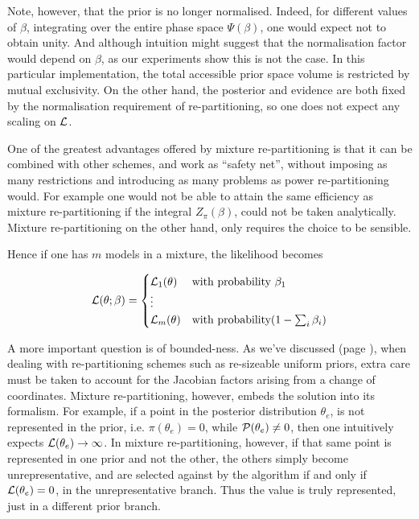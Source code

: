 \documentclass[usenatbib]{mnras}
\begin{document}
Note, however, that the prior is no longer normalised. Indeed, for
different values of \(\beta\), integrating over the entire phase
space \(\Psi(\beta)\), one would expect not to obtain unity. And
although intuition might suggest that the normalisation factor
would depend on \(\beta\), as our experiments show this is not the
case. In this particular implementation, the total accessible
prior space volume is restricted by mutual exclusivity. On the
other hand, the posterior and evidence are both fixed by the
normalisation requirement of re-partitioning, so one does not
expect any scaling on \({\cal L}\). 

One of the greatest advantages offered by mixture re-partitioning
is that it can be combined with other schemes, and work as
``safety net'', without imposing as many restrictions and
introducing as many problems as power re-partitioning would. For
example one would not be able to attain the same efficiency as
mixture re-partitioning if the integral \(Z_{\pi}(\beta)\), could not
be taken analytically. Mixture re-partitioning on the other hand,
only requires the choice to be sensible.

Hence if one has \(m\) models in a mixture, the likelihood becomes 

\begin{equation}
  {\cal L}(\theta; \beta)  = \begin{cases}
	{\cal L}_{1}(\theta) & \text{with probability } \beta_{1}\\
    \vdots\\
	{\cal L}_{m}(\theta) & \text{with probability} (1- \sum_{i}\beta_{i})
	\end{cases}
\end{equation}


A more important question is of bounded-ness. As we've discussed
(page \pageref{domain-discussion}), when dealing with re-partitioning
schemes such as re-sizeable uniform priors, extra care must be
taken to account for the Jacobian factors arising from a change of
coordinates. Mixture re-partitioning, however, embeds the solution
into its formalism. For example, if a point in the posterior
distribution \(\theta_{e}\), is not represented in the prior, i.e.
\(\pi(\theta_{e}) = 0\), while \({\cal P}(\theta_{e}) \ne 0\), then
one intuitively expects \({\cal L}(\theta_{e}) \rightarrow
	\infty\). In mixture re-partitioning, however, if that same point is
represented in one prior and not the other, the others simply
become unrepresentative, and are selected against by the algorithm
if and only if \({\cal L}(\theta_{e}) = 0\), in the unrepresentative
branch. Thus the value is truly represented, just in a different
prior branch.
\end{document}
